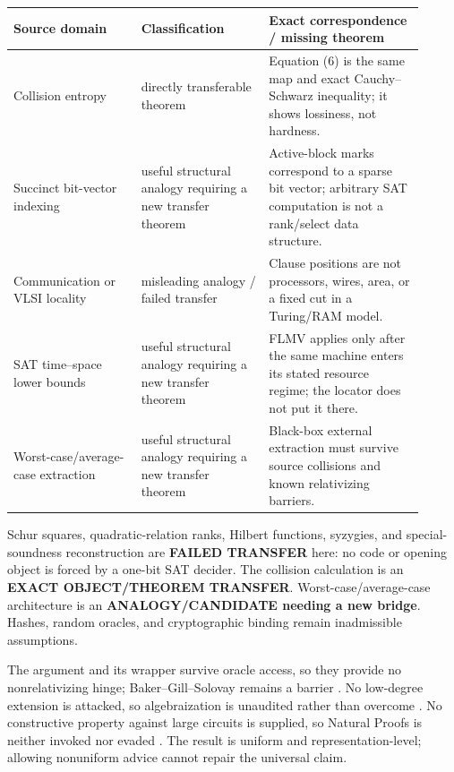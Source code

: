 \documentclass[11pt]{article}
\begin{document}
\begin{center}\small
\begin{tabular}{p{0.29\linewidth}p{0.28\linewidth}p{0.34\linewidth}}
\toprule
Source domain & Classification & Exact correspondence / missing theorem\\
\midrule
Collision entropy & directly transferable theorem & Equation (6) is the
same map and exact Cauchy--Schwarz inequality; it shows lossiness, not hardness.\\
Succinct bit-vector indexing & useful structural analogy requiring a new
transfer theorem & Active-block marks correspond to a sparse bit vector;
arbitrary SAT computation is not a rank/select data structure.\\
Communication or VLSI locality & misleading analogy / failed transfer &
Clause positions are not processors, wires, area, or a fixed cut in a Turing/RAM model.\\
SAT time--space lower bounds & useful structural analogy requiring a new
transfer theorem & FLMV applies only after the same machine enters its stated
resource regime; the locator does not put it there.\\
Worst-case/average-case extraction & useful structural analogy requiring a
new transfer theorem & Black-box external extraction must survive source
collisions and known relativizing barriers.\\
\bottomrule
\end{tabular}
\end{center}

Schur squares, quadratic-relation ranks, Hilbert functions, syzygies, and
special-soundness reconstruction are \textbf{FAILED TRANSFER} here: no code or
opening object is forced by a one-bit SAT decider.  The collision calculation
is an \textbf{EXACT OBJECT/THEOREM TRANSFER}.  Worst-case/average-case
architecture is an \textbf{ANALOGY/CANDIDATE needing a new bridge}.  Hashes,
random oracles, and cryptographic binding remain inadmissible assumptions.

The argument and its wrapper survive oracle access, so they provide no
nonrelativizing hinge; Baker--Gill--Solovay remains a barrier
\cite{BGS75}.  No low-degree extension is attacked, so algebraization is
unaudited rather than overcome \cite{AW09}.  No constructive property against
large circuits is supplied, so Natural Proofs is neither invoked nor evaded
\cite{RR97}.  The result is uniform and representation-level; allowing
nonuniform advice cannot repair the universal claim.
\end{document}
